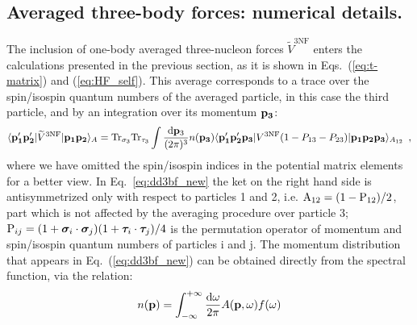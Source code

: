 \subsection{Averaged three-body forces: numerical details.}
\label{subsec:average_3bf}
The inclusion of one-body averaged three-nucleon forces $\widetilde V^\mathrm{3NF}$ enters the calculations presented in the previous section, as it is shown in Eqs.~(\ref{eq:t-matrix}) and (\ref{eq:HF_self}). This average corresponds to a trace over the spin/isospin quantum numbers of the averaged particle, in this case the third particle, and by an integration over its momentum ${\bf p_3}$:
\begin{equation}
\langle {\bf p'_1 p'_2}|\widetilde V^\mathrm{3NF}|{\bf p_1 p_2}\rangle_A =
\mathrm{Tr}_{\sigma_3}\mathrm{Tr}_{\tau_3}
\int \frac{{\mathrm d}{\bf p}_3}{(2\pi)^3}n({\bf p_3})
\langle {\bf p_1' p_2' p_3}|V^\mathrm{3NF}
(1-P_{13}-P_{23})
|{\bf p_1 p_2 p_3}\rangle_{A_{12}}\ \,,
\label{eq:dd3bf_new}
\end{equation}
where we have omitted the spin/isospin indices in the potential matrix elements for a better view. In Eq.~\ref{eq:dd3bf_new} the ket on the right hand side is antisymmetrized only with respect to particles 1 and 2, i.e. ${\rm A}_{12}=(1-{\rm P}_{12})/2$, part which is not affected by the averaging procedure over particle 3; ${\rm P}_{ij}=(1+\boldsymbol \sigma_i\cdot\boldsymbol \sigma_j)(1+\boldsymbol \tau_i\cdot\boldsymbol \tau_j)/4$ is the permutation operator of momentum and spin/isospin quantum numbers of particles i and j. The momentum distribution that appears in Eq.~(\ref{eq:dd3bf_new}) can be obtained directly from the spectral function, via the relation:
\begin{equation}
\label{eq:mom_dist}
n({\bf p})=\int_{-\infty}^{+\infty}\frac{{\rm d}\omega}{2\pi}A({\bf p},\omega)f(\omega)
\end{equation}

